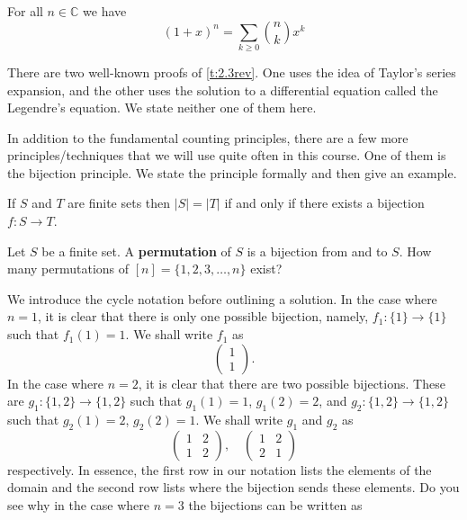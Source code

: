 \begin{theorem}
For all $n\in\mathbb{C}$ we have
\[
(1+x)^n = \sum_{k\geq 0}\binom{n}{k}x^k
\]
\label{t:2.3rev}
\end{theorem}
\begin{remark}
There are two well-known proofs of \cref{t:2.3rev}. One uses the idea of Taylor's series expansion, and the other uses the solution to a differential equation called the Legendre's equation. We state neither one of them here.  
\end{remark}
In addition to the fundamental counting principles, there are a few more principles/techniques that we will use quite often in this course. One of them is the bijection principle. We state the principle formally and then give an example.
\begin{theorem}
If $S$ and $T$ are finite sets then $|S|=|T|$ if and only if there exists a bijection $f:S\to T$.
\end{theorem}
\begin{question}
Let $S$ be a finite set. A \textbf{permutation} of $S$ is a bijection from and to $S$. How many permutations of $[n]=\{1,2,3,\ldots,n\}$ exist?
\end{question}
We introduce the cycle notation before outlining a solution. In the case where $n=1$, it is clear that there is only one possible bijection, namely, $f_1:\{1\}\to\{1\}$ such that $f_1 \left(1 \right) =1$. We shall write $f_1$ as \[
\begin{pmatrix}
	1 \\ 1
\end{pmatrix}
.\] In the case where $n=2$, it is clear that there are two possible bijections. These are $g_1:\{1,2\}\to \{1,2\}$ such that $g_1\left(1 \right) =1$, $g_1\left( 2 \right)=2$, and $g_{2}:\{1,2\}\to\{1,2\}$ such that $g_{2}\left(1  \right) =2$, $g_{2}\left( 2 \right) =1$. We shall write $g_{1}$ and $g_{2}$ as \[
\begin{pmatrix} 1 & 2 \\ 1 & 2 \end{pmatrix}, \quad \begin{pmatrix} 1 & 2 \\ 2 & 1 \end{pmatrix} 
\] respectively. In essence, the first row in our notation lists the elements of the domain and the second row lists where the bijection sends these elements. Do you see why in the case where $n=3$ the bijections can be written as 
